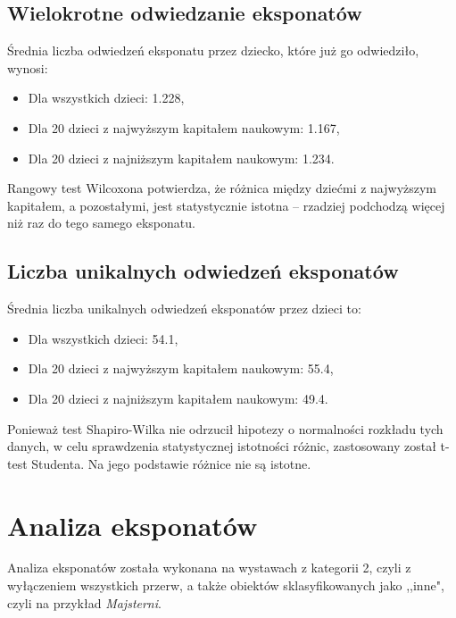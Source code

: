 \documentclass[conference]{IEEEtran}
\begin{document}
\subsection{Wielokrotne odwiedzanie eksponatów}
Średnia liczba odwiedzeń eksponatu przez dziecko, które już go odwiedziło, wynosi:
\begin{itemize}
\item Dla wszystkich dzieci: 1.228,
\item Dla 20 dzieci z najwyższym kapitałem naukowym: 1.167,
\item Dla 20 dzieci z najniższym kapitałem naukowym: 1.234.
\end{itemize}
Rangowy test Wilcoxona potwierdza, że różnica między dziećmi z najwyższym kapitałem, a pozostałymi, jest statystycznie istotna -- rzadziej podchodzą więcej niż raz do tego samego eksponatu.
\subsection{Liczba unikalnych odwiedzeń eksponatów}
Średnia liczba unikalnych odwiedzeń eksponatów przez dzieci to:
\begin{itemize}
\item Dla wszystkich dzieci: 54.1,
\item Dla 20 dzieci z najwyższym kapitałem naukowym: 55.4,
\item Dla 20 dzieci z najniższym kapitałem naukowym: 49.4.
\end{itemize}
Ponieważ test Shapiro-Wilka nie odrzucił hipotezy o normalności rozkładu tych danych, w celu sprawdzenia statystycznej istotności różnic, zastosowany został t-test Studenta. Na jego podstawie różnice nie są istotne.

\section{Analiza eksponatów}
Analiza eksponatów została wykonana na wystawach z kategorii 2, czyli z wyłączeniem wszystkich przerw, a także obiektów sklasyfikowanych jako ,,inne", czyli na przykład \textit{Majsterni}.
\end{document}
